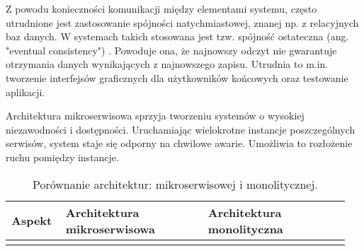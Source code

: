 Z powodu konieczności komunikacji między elementami systemu, często utrudnione jest zastosowanie spójności natychmiastowej, znanej np. z relacyjnych baz danych. W systemach takich stosowana jest tzw. spójność ostateczna (ang. "eventual consistency") \cite{eventual_consistency}. Powoduje ona, że najnowszy odczyt nie gwarantuje otrzymania danych wynikających z najnowszego zapisu. Utrudnia to m.in. tworzenie interfejsów graficznych dla użytkowników końcowych oraz testowanie aplikacji.

Architektura mikroserwisowa sprzyja tworzeniu systemów o wysokiej niezawodności i dostępności. Uruchamiając wielokrotne instancje poszczególnych serwisów, system staje się odporny na chwilowe awarie. Umożliwia to rozłożenie ruchu pomiędzy instancje.

\begin{longtable}{| m{0.15\linewidth} | m{0.4\linewidth} | m{0.4\linewidth} |}
    \caption{Porównanie architektur: mikroserwisowej i monolitycznej.}
    \label{table:architektura_porownanie} \\

    \hline
    Aspekt & Architektura mikroserwisowa & Architektura monolityczna \\ \hline\hline \endfirsthead \endfoot
    \hline \endlastfoot


\end{longtable}
